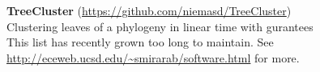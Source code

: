 \documentclass[margin,line,letterpaper]{resume}
\begin{document}
\begin{resume}
\textbf{TreeCluster} (\url{https://github.com/niemasd/TreeCluster})\\
Clustering leaves of a phylogeny in linear time with gurantees
\vspace{2mm}\\
This list has recently grown too long to maintain. 
See \url{http://eceweb.ucsd.edu/~smirarab/software.html} for more. 

\end{resume}
\end{document}

